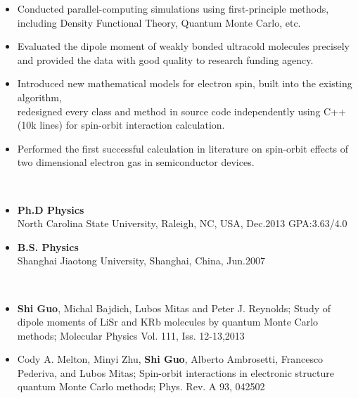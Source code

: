 \documentclass[11pt]{article} %
\begin{document}
\begin{itemize}
  \item Conducted parallel-computing simulations using first-principle methods, including Density Functional Theory, Quantum Monte Carlo, etc.\\
\vspace{-4mm}
   \item Evaluated the dipole moment of weakly bonded ultracold molecules precisely and provided
the data with good quality to research funding agency.\\
\vspace{-4mm}
  \item Introduced new mathematical models for electron spin, built into the existing algorithm,\\
  redesigned every class and method in source code independently using C++(10k lines) for spin-orbit interaction calculation.\\

\vspace{-4mm}
   \item Performed the first successful calculation in literature on spin-orbit effects of two dimensional electron gas in semiconductor devices.\\
\end{itemize}
\vspace{-3mm}
 \\
\vspace{-5mm}
\begin{itemize}
  \item {\bf Ph.D Physics} \hspace{100mm}   \\
    North Carolina State University, Raleigh, NC, USA, Dec.2013 \hspace*{2mm} GPA:3.63/4.0\\
\vspace{-4mm}
  \item {\bf B.S. Physics}\\
    Shanghai Jiaotong University, Shanghai, China, Jun.2007\\
\vspace{0mm}
\end{itemize}

\\
\vspace{-5mm}
\begin{itemize}
  \item {\bf Shi Guo}, Michal Bajdich, Lubos Mitas and Peter J. Reynolds;
Study of dipole moments of LiSr and KRb molecules by quantum Monte Carlo methods;
Molecular Physics Vol. 111, Iss. 12-13,2013
  \item Cody A. Melton, Minyi Zhu, {\bf Shi Guo}, Alberto Ambrosetti, Francesco Pederiva, and Lubos Mitas;
Spin-orbit interactions in electronic structure quantum Monte Carlo methods;
Phys. Rev. A 93, 042502
\end{itemize}
\end{document}
